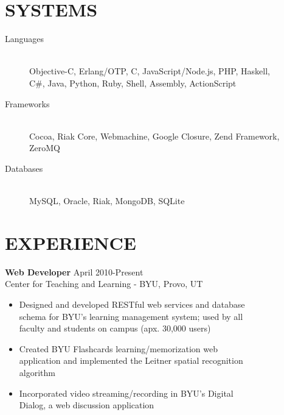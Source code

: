 \documentclass[margin]{res}
\begin{document}
 


  \address{\bf  377 N 750 E\\Provo, UT 84606\\(801) 803-8577}
  \address{bytheway.cameron@gmail.com\\LinkedIn: Cameron Bytheway}

  \begin{resume}

    \section{SYSTEMS}
      \begin{description}
        \item[Languages] \hfill \\
        Objective-C, Erlang/OTP, C, JavaScript/Node.js, PHP, Haskell, \\
        C\#, Java, Python, Ruby, Shell, Assembly, ActionScript
        \item[Frameworks] \hfill \\
        Cocoa, Riak Core, Webmachine, Google Closure, Zend Framework, ZeroMQ
        \item[Databases] \hfill \\
        MySQL, Oracle, Riak, MongoDB, SQLite
      \end{description}

    \section{EXPERIENCE}
      {\bf Web Developer} \hfill April 2010-Present \\
      Center for Teaching and Learning - BYU, Provo, UT
      \begin{itemize} \itemsep -2pt
          \item Designed and developed RESTful web services and database\\
           schema for BYU's learning management system; used by all \\
           faculty and students on campus (apx. 30,000 users)
          \item Created BYU Flashcards learning/memorization web \\
          application and implemented the Leitner spatial recognition \\
          algorithm
          \item Incorporated video streaming/recording in BYU's Digital \\
          Dialog, a web discussion application
      \end{itemize}


\end{resume}
\end{document}
